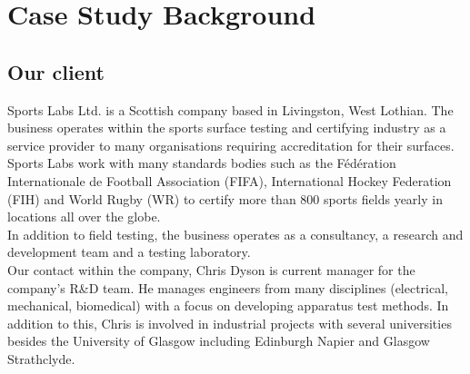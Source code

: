 \documentclass{l3proj}
\begin{document}
\section{Case Study Background}
\subsection{Our client}
Sports Labs Ltd. is a Scottish company based in Livingston, West Lothian. The business operates within the sports surface testing and certifying industry as a service provider to many organisations requiring accreditation for their surfaces. Sports Labs work with many standards bodies such as the Fédération Internationale de Football Association (FIFA), International Hockey Federation (FIH) and World Rugby (WR) to certify more than 800 sports fields yearly in locations all over the globe. \\
In addition to field testing, the business  operates as a consultancy, a research and development team and a testing laboratory.\\
Our contact within the company, Chris Dyson is current manager for the company's R\&D team. He manages engineers from many disciplines (electrical, mechanical, biomedical) with a focus on developing apparatus test methods. In addition to this, Chris is involved in industrial projects with several universities besides the University of Glasgow including Edinburgh Napier and Glasgow Strathclyde.  
\end{document}
